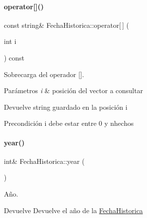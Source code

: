 \paragraph{\texorpdfstring{operator[]()}{operator[]()}\hspace{0.1cm}{\footnotesize\ttfamily [2/2]}}
{\footnotesize\ttfamily const string\& Fecha\+Historica\+::operator\mbox{[}$\,$\mbox{]} (\begin{DoxyParamCaption}\item[{int}]{i }\end{DoxyParamCaption}) const}



Sobrecarga del operador \mbox{[}\mbox{]}. 


\begin{DoxyParams}{Parámetros}
{\em i} & posición del vector a consultar \\
\hline
\end{DoxyParams}
\begin{DoxyReturn}{Devuelve}
string guardado en la posición i 
\end{DoxyReturn}
\begin{DoxyPrecond}{Precondición}
i debe estar entre 0 y nhechos 
\end{DoxyPrecond}
\mbox{\label{classFechaHistorica_a3ef5b14533374b8c8afc7d3d9c665f40}} 
\paragraph{\texorpdfstring{year()}{year()}\hspace{0.1cm}{\footnotesize\ttfamily [1/2]}}
{\footnotesize\ttfamily int\& Fecha\+Historica\+::year (\begin{DoxyParamCaption}{ }\end{DoxyParamCaption})}



Año. 

\begin{DoxyReturn}{Devuelve}
Devuelve el año de la {\ttfamily \hyperlink{classFechaHistorica}{Fecha\+Historica}} 
\end{DoxyReturn}
\mbox{\label{classFechaHistorica_a3c9a08e7f7bf07892960d4e69e10b429}} 
